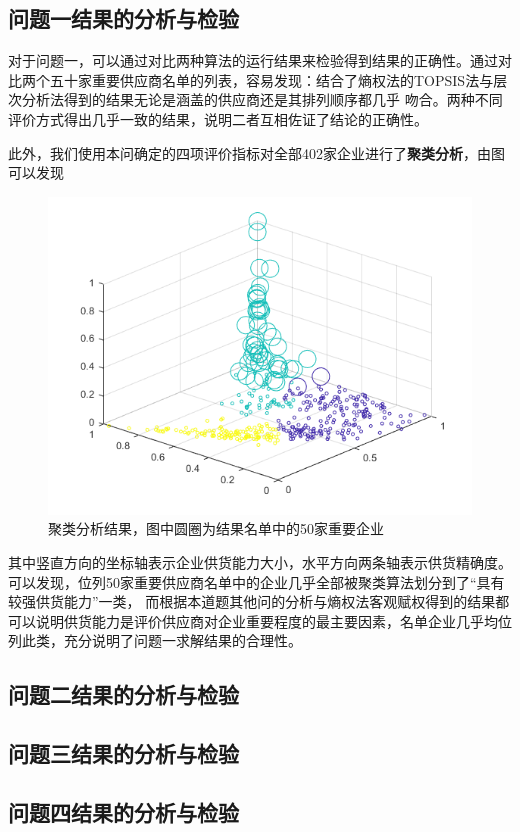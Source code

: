 \documentclass{cumcmthesis}
\begin{document}
\subsection{问题一结果的分析与检验}
对于问题一，可以通过对比两种算法的运行结果来检验得到结果的正确性。通过对比两个五十家重要供应商名单的列表，容易发现：结合了熵权法的TOPSIS法与层次分析法得到的结果无论是涵盖的供应商还是其排列顺序都几乎
吻合。两种不同评价方式得出几乎一致的结果，说明二者互相佐证了结论的正确性。\par
此外，我们使用本问确定的四项评价指标对全部402家企业进行了\textbf{聚类分析}，由图可以发现
\begin{figure}[htbp]
    \centering
    \includegraphics[scale = 0.7]{julei.png}
    \centering
    \caption{聚类分析结果，图中圆圈为结果名单中的50家重要企业} \label{fig:5}
\end{figure}
其中竖直方向的坐标轴表示企业供货能力大小，水平方向两条轴表示供货精确度。可以发现，位列50家重要供应商名单中的企业几乎全部被聚类算法划分到了“具有较强供货能力”一类，
而根据本道题其他问的分析与熵权法客观赋权得到的结果都可以说明供货能力是评价供应商对企业重要程度的最主要因素，名单企业几乎均位列此类，充分说明了问题一求解结果的合理性。
\subsection{问题二结果的分析与检验}
\subsection{问题三结果的分析与检验}
\subsection{问题四结果的分析与检验}
\end{document}
